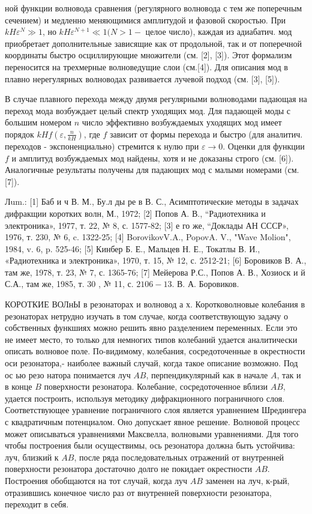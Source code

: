 \documentclass[10pt]{article}
\begin{document}
ной функции волновода сравнения (регулярного волновода с тем же поперечным сечением) и медленно меняющимися амплитудой и фазовой скоростью. При $k H \varepsilon^{N} \gg 1$, но $k H \varepsilon^{N+1} \ll 1(N>1-$ целое число), каждая из адиабатич. мод приобретает дополнительные зависящие как от продольной, так и от поперечной координаты быстро осциллирующие множители (см. [2], [3]). Этот формализм переносится на трехмерные волноведущие слои (см.[4]). Для описания мод в плавно нерегулярных волноводах развивается лучевой подход (см. [3], [5]).



В случае плавного перехода между двумя регулярными волноводами падающая на переход мода возбуждает целый спектр уходящих мод. Для падающей моды с большим номером $n$ число эффективно возбуждаемых уходящих мод имеет порядок $k H f\left(\varepsilon, \frac{n}{k H}\right)$, где $f$ зависит от формы перехода и быстро (для аналитич. переходов - экспоненциально) стремится к нулю при $\varepsilon \rightarrow 0$. Оценки для функции $f$ и амплитуд возбуждаемых мод найдены, хотя и не доказаны строго (см. [6]). Аналогичные результаты получены для падающих мод с малыми номерами (см. [7]).



Лum.: [1] Баб и ч В. М., Бу.л ды ре в В. С., Асимптотические методы в задачах дифракщии коротких волн, М., 1972; [2] Попов А. В., “Радиотехника и электроника», 1977, т. 22, № 8, с. 1577-82; [3] е го же, “Доклады АН СССР», 1976, т. 230, № 6, c. 1322-25; [4] BorovikovV.A., PopovA. V., "Wave Molion", 1984, v. 6, p. 525-46; [5] Кинбер Б. Е., Мальцев Н. Е., Токатлы В. И., «Радиотехника и электроника», 1970, т. 15, № 12, с. 2512-21; [6] Боровиков В. А., там же, 1978, т. 23, № 7, с. 1365-76; [7] Мейерова Р.С., Попов А. В., Хозиоск и й С.А., там же, 1985, т. 30 , № 11, с. $2106-13$. В. А. Боровиков.



КОРОТКИЕ ВОЛнЫ в резонаторах и волновод а х. Коротковолновые колебания в резонаторах нетрудно изучать в том случае, когда соответствующую задачу о собственных функшиях можно решить явно разделением переменных. Если это не имеет место, то только для немногих типов колебаний удается аналитически описать волновое поле. По-видимому, колебания, сосредоточенные в окрестности оси резонатора,- наиболее важный случай, когда такое описание возможно. Под ос ью резо натора понимается луч $A B$, перпендикулярный как в начале $A$, так и в конце $B$ поверхности резонатора. Колебание, сосредоточенное вблизи $A B$, удается построить, используя методику дифракционного пограничного слоя. Соответствующее уравнение пограничного слоя является уравнением Шредингера с квадратичным потенциалом. Оно допускает явное решение. Волновой процесс может описываться уравнениями Максвелла, волновыми уравнениями. Для того чтобы построения были осуществимы, ось резонатора должна быть устойчива: луч, близкий к $A B$, после ряда последовательных отражений от внутренней поверхности резонатора достаточно долго не покидает окрестности $A B$. Построения обобщаются на тот случай, когда луч $A B$ заменен на луч, к-рый, отразившись конечное число раз от внутренней поверхности резонатора, переходит в себя.
\end{document}
